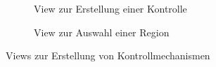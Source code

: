 \documentclass[notables, nomenclature, oneside, 150]{HSMW-Thesis}
\begin{document}
\begin{figure}[h!]
\begin{subfigure}[t]{0.3\textwidth}
        				\caption{View zur Erstellung einer Kontrolle}
        				\label{fig:l2}
    				\end{subfigure}
    				\begin{subfigure}[t]{0.3\textwidth}
        				\caption{View zur Auswahl einer Region}
        				\label{fig:l3}
    				\end{subfigure}
    				\caption{Views zur Erstellung von Kontrollmechanismen}
					\label{fig:link1}
				\end{figure}
\end{document}
